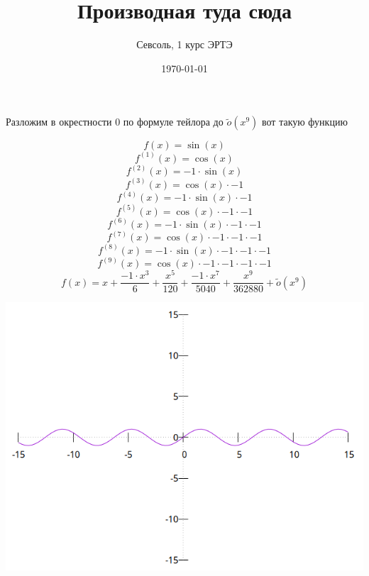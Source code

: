 \documentclass[12pt, a4paper]{article}
\begin{document}
\title{Производная туда сюда
}\author{Севсоль, 1 курс ЭРТЭ}
\date{\today}
\maketitle 
\centerline{Разложим в окрестности 0 по формуле тейлора до $\tilde{o}(x^9)$ вот такую функцию} 
\begin{equation}
f(x) = \sin(x)
\end{equation}
\begin{equation}
{f}^{(1)}(x) = \cos(x)\end{equation}\begin{equation}
{f}^{(2)}(x) = -1 \cdot \sin(x)\end{equation}\begin{equation}
{f}^{(3)}(x) = \cos(x) \cdot -1\end{equation}\begin{equation}
{f}^{(4)}(x) = -1 \cdot \sin(x) \cdot -1\end{equation}\begin{equation}
{f}^{(5)}(x) = \cos(x) \cdot -1 \cdot -1\end{equation}\begin{equation}
{f}^{(6)}(x) = -1 \cdot \sin(x) \cdot -1 \cdot -1\end{equation}\begin{equation}
{f}^{(7)}(x) = \cos(x) \cdot -1 \cdot -1 \cdot -1\end{equation}\begin{equation}
{f}^{(8)}(x) = -1 \cdot \sin(x) \cdot -1 \cdot -1 \cdot -1\end{equation}\begin{equation}
{f}^{(9)}(x) = \cos(x) \cdot -1 \cdot -1 \cdot -1 \cdot -1\end{equation}
\begin{equation}f(x) = x+\frac{-1 \cdot {x}^{3}}{6}+\frac{{x}^{5}}{120}+\frac{-1 \cdot {x}^{7}}{5040}+\frac{{x}^{9}}{362880} + \tilde{o}(x^9)
\end{equation}
\begin{center}
\includegraphics[scale=0.5]{start_func.png}
\end{center}
\end{document}
